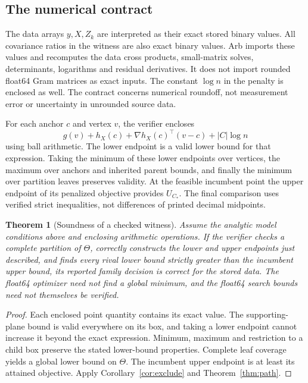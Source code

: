 \documentclass[11pt,a4paper]{article}
\newtheorem{theorem}{Theorem}
\theoremstyle{remark}\newtheorem{remark}[theorem]{Remark}
\begin{document}
\subsection{The numerical contract}
The data arrays $y,X,Z_k$ are interpreted as their exact stored binary values.
All covariance ratios in the witness are also exact binary values. Arb imports
these values and recomputes the data cross products, small-matrix solves,
determinants, logarithms and residual derivatives. It does not import rounded
float64 Gram matrices as exact inputs. The constant $\log n$ in the penalty is
enclosed as well. The contract concerns numerical roundoff, not measurement error
or uncertainty in unrounded source data.

For each anchor $c$ and vertex $v$, the verifier encloses
\begin{equation}
g(v)+h_X(c)+\nabla h_X(c)^\top(v-c)+|C|\log n
\end{equation}
using ball arithmetic. The lower endpoint is a valid lower bound for that
expression. Taking the minimum of these lower endpoints over vertices, the
maximum over anchors and inherited parent bounds, and finally the minimum over
partition leaves preserves validity. At the feasible incumbent point the upper
endpoint of its penalized objective provides $U_{C_*}$. The final comparison
uses verified strict inequalities, not differences of printed decimal midpoints.

\begin{theorem}[Soundness of a checked witness]\label{thm:verified}
Assume the analytic model conditions above and enclosing arithmetic operations.
If the verifier checks a complete partition of $\Theta$, correctly constructs
the lower and upper endpoints just described, and finds every rival lower bound
strictly greater than the incumbent upper bound, its reported family decision
is correct for the stored data. The float64 optimizer need not find a global
minimum, and the float64 search bounds need not themselves be verified.
\end{theorem}
\begin{proof}
Each enclosed point quantity contains its exact value. The supporting-plane
bound is valid everywhere on its box, and taking a lower endpoint cannot increase
it beyond the exact expression. Minimum, maximum and restriction to a child box
preserve the stated lower-bound properties. Complete leaf coverage yields a
global lower bound on $\Theta$. The incumbent upper endpoint is at least its
attained objective. Apply Corollary~\ref{cor:exclude} and
Theorem~\ref{thm:path}.
\end{proof}
\end{document}
